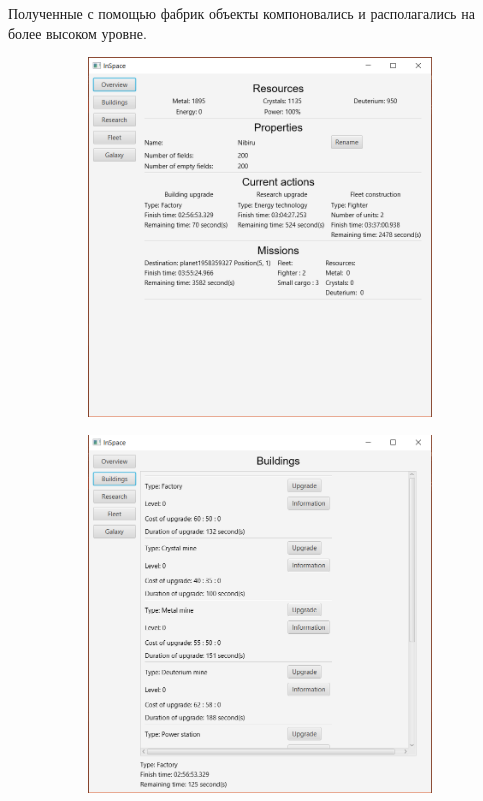 Полученные с помощью фабрик объекты компоновались и располагались на более высоком уровне.
\begin{figure}[H]
\centering
\begin{subfigure}[b]{0.28\textwidth} 
\includegraphics[width=1\textwidth]{../screenshots/1.png}
\end{subfigure}
\begin{subfigure}[b]{0.28\textwidth} 
\includegraphics[width=1\textwidth]{../screenshots/2.png}

\end{subfigure}
\end{figure}
